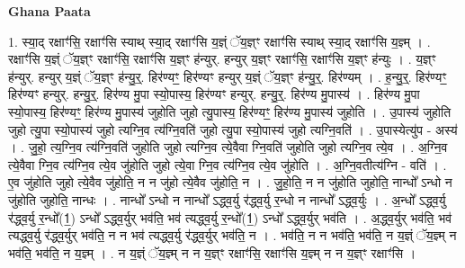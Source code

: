 \documentclass[17pt]{extarticle}
\begin{document}
\textbf{Ghana Paata } \newline

1. स्या॒द् रक्षाꣳ॑सि॒ रक्षाꣳ॑सि स्याथ् स्या॒द् रक्षाꣳ॑सि य॒ज्ञ्ं ॅय॒ज्ञ्ꣳ रक्षाꣳ॑सि स्याथ् स्या॒द् रक्षाꣳ॑सि य॒ज्ञ्म् । . रक्षाꣳ॑सि य॒ज्ञ्ं ॅय॒ज्ञ्ꣳ रक्षाꣳ॑सि॒ रक्षाꣳ॑सि य॒ज्ञ्ꣳ ह॑न्युर्. हन्युर् य॒ज्ञ्ꣳ रक्षाꣳ॑सि॒ रक्षाꣳ॑सि य॒ज्ञ्ꣳ ह॑न्युः । . य॒ज्ञ्ꣳ ह॑न्युर्. हन्युर् य॒ज्ञ्ं ॅय॒ज्ञ्ꣳ ह॑न्यु॒र्॒. हिर॑ण्यꣳ॒॒ हिर॑ण्यꣳ हन्युर् य॒ज्ञ्ं ॅय॒ज्ञ्ꣳ ह॑न्यु॒र्॒. हिर॑ण्यम् । . ह॒न्यु॒र्॒. हिर॑ण्यꣳ॒॒ हिर॑ण्यꣳ हन्युर्. हन्यु॒र्॒. हिर॑ण्य मु॒पा स्यो॒पास्य॒ हिर॑ण्यꣳ हन्युर्. हन्यु॒र्॒. हिर॑ण्य मु॒पास्य॑ । . हिर॑ण्य मु॒पा स्यो॒पास्य॒ हिर॑ण्यꣳ॒॒ हिर॑ण्य मु॒पास्य॑ जुहोति जुहो त्यु॒पास्य॒ हिर॑ण्यꣳ॒॒ हिर॑ण्य मु॒पास्य॑ जुहोति । . उ॒पास्य॑ जुहोति जुहो त्यु॒पा स्यो॒पास्य॑ जुहो त्यग्नि॒व त्य॑ग्नि॒वति॑ जुहो त्यु॒पा स्यो॒पास्य॑ जुहो त्यग्नि॒वति॑ । . उ॒पास्येत्यु॑प - अस्य॑ । . जु॒हो॒ त्य॒ग्नि॒व त्य॑ग्नि॒वति॑ जुहोति जुहो त्यग्नि॒व त्ये॒वैवा ग्नि॒वति॑ जुहोति जुहो त्यग्नि॒व त्ये॒व । . अ॒ग्नि॒व त्ये॒वैवा ग्नि॒व त्य॑ग्नि॒व त्ये॒व जु॑होति जुहो त्ये॒वा ग्नि॒व त्य॑ग्नि॒व त्ये॒व जु॑होति । . अ॒ग्नि॒वतीत्य॑ग्नि - वति॑ । . ए॒व जु॑होति जुहो त्ये॒वैव जु॑होति॒ न न जु॑हो त्ये॒वैव जु॑होति॒ न । . जु॒हो॒ति॒ न न जु॑होति जुहोति॒ नान्धो᳚ ऽन्धो न जु॑होति जुहोति॒ नान्धः । . नान्धो᳚ ऽन्धो न नान्धो᳚ ऽद्ध्व॒र्यु र॑द्ध्व॒र्यु र॒न्धो न नान्धो᳚ ऽद्ध्व॒र्युः । . अ॒न्धो᳚ ऽद्ध्व॒र्यु र॑द्ध्व॒र्यु र॒न्धो᳚(1॒) ऽन्धो᳚ ऽद्ध्व॒र्युर् भव॑ति॒ भव॑ त्यद्ध्व॒र्यु र॒न्धो᳚(1॒) ऽन्धो᳚ ऽद्ध्व॒र्युर् भव॑ति । . अ॒द्ध्व॒र्युर् भव॑ति॒ भव॑ त्यद्ध्व॒र्यु र॑द्ध्व॒र्युर् भव॑ति॒ न न भव॑ त्यद्ध्व॒र्यु र॑द्ध्व॒र्युर् भव॑ति॒ न । . भव॑ति॒ न न भव॑ति॒ भव॑ति॒ न य॒ज्ञ्ं ॅय॒ज्ञ्म् न भव॑ति॒ भव॑ति॒ न य॒ज्ञ्म् । . न य॒ज्ञ्ं ॅय॒ज्ञ्म् न न य॒ज्ञ्ꣳ रक्षाꣳ॑सि॒ रक्षाꣳ॑सि य॒ज्ञ्म् न न य॒ज्ञ्ꣳ रक्षाꣳ॑सि । \newline
\end{document}
